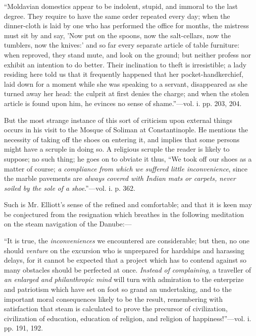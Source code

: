 ``Moldavian
domestics appear to be indolent, stupid, and immoral to the last degree.
They require to have the same order repeated every day; when the
dinner-cloth is laid by one who has performed the office for months, the
mistress must sit by and say, 'Now put on the spoons, now the
salt-cellars, now the tumblers, now the knives:' and so far every
separate article of table furniture: when reproved, they stand mute, and
look on the ground; but neither profess nor exhibit an intention to do
better. Their inclination to theft is irresistible; a lady residing here
told us that it frequently happened that her pocket-handkerchief, laid
down for a moment while she was speaking to a servant, disappeared as
she turned away her head: the culprit at first denies the charge; and
when the stolen article is found upon him, he evinces no sense of shame.''—vol.
i. pp. 203, 204.

But the
most strange instance of this sort of criticism upon external things
occurs in his visit to the Mosque of Soliman at Constantinople. He
mentions the necessity of taking off the shoes on entering it, and
implies that some persons might have a scruple in doing so. A religious
scruple the reader is likely to suppose; no such thing; he goes on to
obviate it thus, ``We took off our shoes as a matter of course; \emph{a
compliance from which we suffered little inconvenience}, since the
marble pavements are \emph{always covered with Indian mats or carpets,
never soiled by the sole of a shoe}.''—vol. i. p. 362.

Such is Mr.
Elliott's sense of the refined and comfortable; and that it is keen may
be conjectured from the resignation which breathes in the following
meditation on the steam navigation of the Danube:—

``It
is true, the \emph{inconveniences} we encountered are considerable; but
then, no one should \emph{venture} on the excursion who is unprepared
for hardships and harassing delays, for it cannot be expected that a
project which has to contend against so many obstacles should be
perfected at once. \emph{Instead of complaining}, a traveller of \emph{an
enlarged and philanthropic mind} will turn with admiration to the
enterprize and patriotism which have set on foot so grand an
undertaking, and to the important moral consequences likely to be the
result, remembering with satisfaction that steam is calculated to prove
the precursor of civilization, civilization of education, education of
religion, and religion of happiness!''—vol. i. pp. 191, 192.

